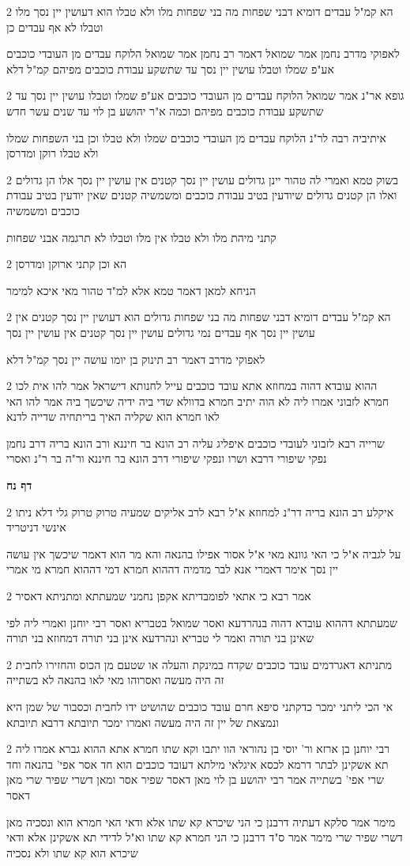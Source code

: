 \documentclass[12pt, openany]{book}
\newcommand{\sethebfont}{
\fontsize{10.5pt}{21.0pt} \selectfont
}
\newcommand{\twocol}[1]{
	{\sethebfont \begin{multicols}{2}
			#1
	\end{multicols}}	
}
\newcommand{\sectname}{}
\newcommand{\newsection}[1]{
	\addcontentsline{toc}{section}{#1}
	\renewcommand{\sectname}{#1}	
	\vspace{-\baselineskip}
	\begin{center}
		\textbf{%
\fontsize{16pt}{16pt}\selectfont
			#1}
	\end{center}
	\vspace{-\baselineskip}
	\nopagebreak
}
\begin{document}
\twocol{הא קמ"ל עבדים דומיא דבני שפחות מה בני שפחות מלו ולא טבלו הוא דעושין יין נסך מלו וטבלו לא אף עבדים כן
\par לאפוקי מדרב נחמן אמר שמואל דאמר רב נחמן אמר שמואל הלוקח עבדים מן העובדי כוכבים אע"פ שמלו וטבלו עושין יין נסך עד שתשקע עבודת כוכבים מפיהם קמ"ל דלא}
\twocol{גופא אר"נ אמר שמואל הלוקח עבדים מן העובדי כוכבים אע"פ שמלו וטבלו עושין יין נסך עד שתשקע עבודת כוכבים מפיהם וכמה א"ר יהושע בן לוי עד שנים עשר חדש
\par איתיביה רבה לר"נ הלוקח עבדים מן העובדי כוכבים שמלו ולא טבלו וכן בני השפחות שמלו ולא טבלו רוקן ומדרסן}
\twocol{בשוק טמא ואמרי לה טהור יינן גדולים עושין יין נסך קטנים אין עושין יין נסך אלו הן גדולים ואלו הן קטנים גדולים שיודעין בטיב עבודת כוכבים ומשמשיה קטנים שאין יודעין בטיב עבודת כוכבים ומשמשיה
\par קתני מיהת מלו ולא טבלו אין מלו וטבלו לא תרגמה אבני שפחות}
\twocol{הא וכן קתני ארוקן ומדרסן
\par הניחא למאן דאמר טמא אלא למ"ד טהור מאי איכא למימר}
\twocol{הא קמ"ל עבדים דומיא דבני שפחות מה בני שפחות גדולים הוא דעושין יין נסך קטנים אין עושין יין נסך אף עבדים נמי גדולים עושין יין נסך קטנים אין עושין יין נסך
\par לאפוקי מדרב דאמר רב תינוק בן יומו עושה יין נסך קמ"ל דלא}
\twocol{ההוא עובדא דהוה במחוזא אתא עובד כוכבים עייל לחנותא דישראל אמר להו אית לכו חמרא לזבוני אמרו ליה לא הוה יתיב חמרא בדוולא שדי ביה ידיה שיכשך ביה אמר להו האי לאו חמרא הוא שקליה האיך בריתחיה שדייה לדנא
\par שרייה רבא לזבוני לעובדי כוכבים איפליג עליה רב הונא בר חיננא ורב הונא בריה דרב נחמן נפקי שיפורי דרבא ושרו ונפקי שיפורי דרב הונא בר חיננא ור"ה בר ר"נ ואסרי}
\newsection{דף נח}
\twocol{איקלע רב הונא בריה דר"נ למחוזא א"ל רבא לרב אליקים שמעיה טרוק טרוק גלי דלא ניתו אינשי דניטריד
\par על לגביה א"ל כי האי גוונא מאי א"ל אסור אפילו בהנאה והא מר הוא דאמר שיכשך אין עושה יין נסך אימר דאמרי אנא לבר מדמיה דההוא חמרא דמי דההוא חמרא מי אמרי}
\twocol{אמר רבא כי אתאי לפומבדיתא אקפן נחמני שמעתתא ומתניתא דאסיר
\par שמעתתא דההוא עובדא דהוה בנהרדעא ואסר שמואל בטבריא ואסר רבי יוחנן ואמרי ליה לפי שאינן בני תורה ואמר לי טבריא ונהרדעא אינן בני תורה דמחוזא בני תורה}
\twocol{מתניתא דאגרדמים עובד כוכבים שקדח במינקת והעלה או שטעם מן הכוס והחזירו לחבית זה היה מעשה ואסרוהו מאי לאו בהנאה לא בשתייה
\par אי הכי ליתני ימכר כדקתני סיפא חרם עובד כוכבים שהושיט ידו לחבית וכסבור של שמן היא ונמצאת של יין זה היה מעשה ואמרו ימכר תיובתא דרבא תיובתא}
\twocol{רבי יוחנן בן ארזא ור' יוסי בן נהוראי הוו יתבו וקא שתו חמרא אתא ההוא גברא אמרו ליה תא אשקינן לבתר דרמא לכסא איגלאי מילתא דעובד כוכבים הוא חד אסר אפי' בהנאה וחד שרי אפי' בשתייה אמר רבי יהושע בן לוי מאן דאסר שפיר אסר ומאן דשרי שפיר שרי מאן דאסר
\par מימר אמר סלקא דעתיה דרבנן כי הני שיכרא קא שתו אלא ודאי האי חמרא הוא ונסכיה מאן דשרי שפיר שרי מימר אמר ס"ד דרבנן כי הני חמרא קא שתו וא"ל לדידי תא אשקינן אלא ודאי שיכרא הוא קא שתו ולא נסכיה}
\end{document}
